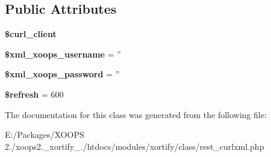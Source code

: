 \subsection*{Public Attributes}
\begin{DoxyCompactItemize}
\item 
\hypertarget{class_r_e_s_t___c_u_r_l_x_m_l_xortify_exchange_a48ace86f5feca4909a4995c4a0f1c0db}{{\bfseries \$curl\-\_\-client}}\label{class_r_e_s_t___c_u_r_l_x_m_l_xortify_exchange_a48ace86f5feca4909a4995c4a0f1c0db}

\item 
\hypertarget{class_r_e_s_t___c_u_r_l_x_m_l_xortify_exchange_a5f4a53d03a72fc2d83f2367aaba37ee2}{{\bfseries \$xml\-\_\-xoops\-\_\-username} = ''}\label{class_r_e_s_t___c_u_r_l_x_m_l_xortify_exchange_a5f4a53d03a72fc2d83f2367aaba37ee2}

\item 
\hypertarget{class_r_e_s_t___c_u_r_l_x_m_l_xortify_exchange_acddfefddabc63ce705d2e8677d3e21a0}{{\bfseries \$xml\-\_\-xoops\-\_\-password} = ''}\label{class_r_e_s_t___c_u_r_l_x_m_l_xortify_exchange_acddfefddabc63ce705d2e8677d3e21a0}

\item 
\hypertarget{class_r_e_s_t___c_u_r_l_x_m_l_xortify_exchange_a74bddf2801aec11171d88380a2212240}{{\bfseries \$refresh} = 600}\label{class_r_e_s_t___c_u_r_l_x_m_l_xortify_exchange_a74bddf2801aec11171d88380a2212240}

\end{DoxyCompactItemize}


The documentation for this class was generated from the following file\-:\begin{DoxyCompactItemize}
\item 
E\-:/\-Packages/\-X\-O\-O\-P\-S 2./xoops2.\-\_\-xortify\-\_./htdocs/modules/xortify/class/rest\-\_\-curlxml.\-php\end{DoxyCompactItemize}
